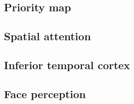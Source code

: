 \documentclass[man, 10pt, a4paper]{book}
\begin{document}
\subsection{Priority map}\label{Priority map}

\subsection{Spatial attention}\label{Spatial attention}

\subsection{Inferior temporal cortex}\label{Inferior temporal cortex}

\subsection{Face perception}\label{Face perception}
\end{document}
